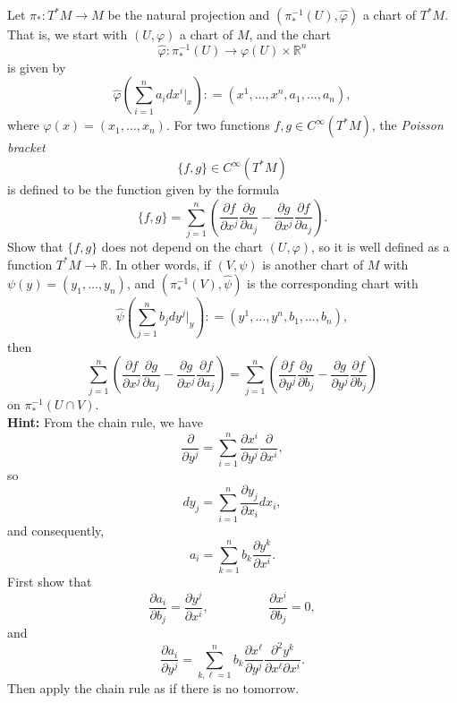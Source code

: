 \documentclass{ximera}
\begin{document}
\begin{exercise}
    Let $\pi _{\ast} : T^{\ast} M \to M$ be the natural projection and $(\pi _{\ast}^{-1 }(U) , \hat{ \varphi}) $ a chart of $T^{\ast}M$. That is, we start with $(U, \varphi)$ a chart of $M$, and  the chart 
    \[  \hat{ \varphi}  : \pi ^{-1}_{\ast} (U) \to  \varphi (U) \times \mathbb{R}^n   \] 
    is given by 
    \[    \hat{ \varphi} \left(  \sum _{i = 1 }^n a_i dx^i \vert _x   \right) : = (  x ^ 1 , \ldots , x^n , a_1, \ldots , a_n ),                   \]
    where $\varphi ( x ) = (x_1, \ldots , x_n)$. For two functions $f, g \in C^{\infty }(T^{\ast}M)$, the \emph{Poisson bracket}
    \[    \{ f , g \} \in C^{\infty}(T^{\ast}M )              \]
    is defined to be the function given by the formula
    \[     \{ f , g \} = \sum_{j = 1 } ^n \left(  \frac{\partial f }{\partial x ^j} \frac{\partial g}{\partial a _j }  - \frac{\partial g }{\partial x ^j} \frac{\partial f}{\partial a _j } \right)   .                      \]
    Show that $\{ f, g \} $ does not depend on the chart $(U, \varphi )$, so it is well defined as a function $T^{\ast}M \to \mathbb{R}$. In other words, if $(V, \psi)$ is another chart of $M$ with $\psi (y) = (y_1, \ldots , y_n)$, and $(\pi_{\ast} ^{-1} (V) , \hat{\psi})$ is the corresponding chart with 
    \[     \hat{\psi }   \left(  \sum _{j = 1 }^n b_j dy^j \vert _y   \right) : = (  y ^ 1 , \ldots , y^n , b_1, \ldots , b_n ),                       \]
    then 
    \[     \sum_{j = 1 } ^n \left(  \frac{\partial f }{\partial x ^j} \frac{\partial g}{\partial a _j }  - \frac{\partial g }{\partial x ^j} \frac{\partial f}{\partial a _j } \right)  = \sum_{j = 1 } ^n \left(  \frac{\partial f }{\partial y ^j} \frac{\partial g}{\partial b _j }  - \frac{\partial g }{\partial y ^j} \frac{\partial f}{\partial b _j } \right)                               \]
    on $\pi_{\ast} ^{-1} (U \cap V)$. \\

    \textbf{Hint: }From the chain rule, we have 
    \[        \frac{\partial }{\partial y ^j} = \sum _{i = 1} ^n  \frac{\partial x ^i }{ \partial y ^j}  \frac{\partial }{\partial x ^i }  ,       \]
    so 
    \[         d y_j = \sum_{i = 1 } ^n \frac{\partial y_ j}{\partial x _i} d x_i    ,    \]
    and consequently, 
    \[      a_ i = \sum _{k=1}^n b_k \frac{\partial y ^k}{\partial x ^i }.                      \]
    First show that
    \[       \frac{\partial a _i}{\partial b_j} = \frac{\partial y ^ j}{\partial x ^i} ,          \hspace{2cm} \frac{\partial x^i }{\partial b _j } = 0 ,         \]
    and 
    \[       \frac{\partial a_i}{\partial y ^j} = \sum _{k,\ell = 1 }^n   b_k \frac{\partial x ^{\ell}}{ \partial y ^j} \frac{\partial ^2  y ^k }{ \partial x ^{\ell } \partial x ^{i}} .                    \]
    Then apply the chain rule as if there is no tomorrow.
\end{exercise}
    
\end{document}
